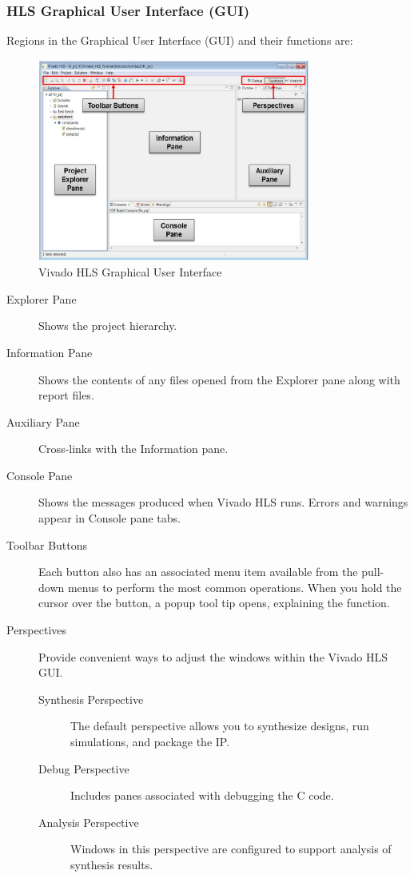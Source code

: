 \subsubsection{HLS Graphical User Interface (GUI)} 
Regions in the Graphical User Interface (GUI) and their functions are:
\begin{figure}[H]
    \begin{center}
        \includegraphics[width=0.8\textwidth]{images/panes.png}
        \caption{Vivado HLS Graphical User Interface}
        \label{panes}
    \end{center}
  \end{figure}

\begin{description}
    \item[Explorer Pane] Shows the project hierarchy.
    \item[Information Pane] Shows the contents of any files opened from the Explorer pane along with report files.
    \item[Auxiliary Pane] Cross-links with the Information pane.
    \item[Console Pane] Shows the messages produced when Vivado HLS runs. Errors and warnings appear in Console pane tabs.
    \item[Toolbar Buttons] Each button also has an associated menu item available from the pull-down menus to perform the most common operations.
    When you hold the cursor over the button, a popup tool tip opens, explaining the function.
    \item[Perspectives] Provide convenient ways to adjust the windows within the Vivado HLS GUI. 
    \begin{description}
        \item[Synthesis Perspective] The default perspective allows you to synthesize designs, run simulations, and package the IP.
        \item[Debug Perspective] Includes panes associated with debugging the C code.
        \item[Analysis Perspective] Windows in this perspective are configured to support analysis of synthesis results.
    \end{description}
\end{description}


